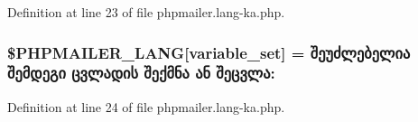 Definition at line 23 of file phpmailer.\+lang-\/ka.\+php.

\subsubsection[{\texorpdfstring{\$\+P\+H\+P\+M\+A\+I\+L\+E\+R\+\_\+\+L\+A\+NG}{$PHPMAILER_LANG}}]{\setlength{\rightskip}{0pt plus 5cm}\$P\+H\+P\+M\+A\+I\+L\+E\+R\+\_\+\+L\+A\+NG\mbox{[}\textquotesingle{}variable\+\_\+set\textquotesingle{}\mbox{]} = \textquotesingle{}შეუძლებელია შემდეგი ცვლადის შექმნა ან შეცვლა\+: \textquotesingle{}}\hypertarget{phpmailer_8lang-ka_8php_af795debc7a739d038742691c358d9032}{}\label{phpmailer_8lang-ka_8php_af795debc7a739d038742691c358d9032}


Definition at line 24 of file phpmailer.\+lang-\/ka.\+php.


